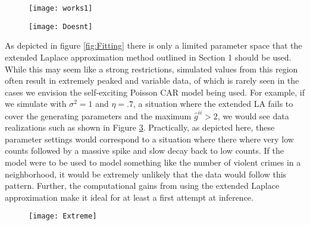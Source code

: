 \documentclass[11pt]{isuthesis}
\begin{document}
		\begin{figure}[!htp]
			\centering
				\texttt{[image: works1]}
				\label{fig:gii terms}
			\end{figure}
			\begin{figure}[!htp]
				\centering
				\texttt{[image: Doesnt]}
			\label{fig:gii terms2}
		\end{figure}
	
	
	
	As depicted in figure \ref{fig:Fitting} there is only a limited parameter space that the extended Laplace approximation method outlined in Section 1 should be used.  While this may seem like a strong restrictions, simulated values from this region often result in extremely peaked and variable data, of which is rarely seen in the cases we envision the self-exciting Poisson CAR model being used.  For example, if we simulate with $\sigma^2=1$ and $\eta=.7$, a situation where the extended LA fails to cover the generating parameters and the maximum $\hat{g}^{ii}>2$, we would see data realizations such as shown in Figure \ref{fig:Extreme}.  Practically, as depicted here, these parameter settings would correspond to a situation where there where very low counts followed by a massive spike and slow decay back to low counts.  If the model were to be used to model something like the number of violent crimes in a neighborhood, it would be extremely unlikely that the data would follow this pattern.  Further, the computational gains from using the extended Laplace approximation make it ideal for at least a first attempt at inference.
	
	\begin{figure}[!htp]
		\centering
		\texttt{[image: Extreme]}
		\label{fig:Extreme}
	\end{figure}
	
\end{document}
